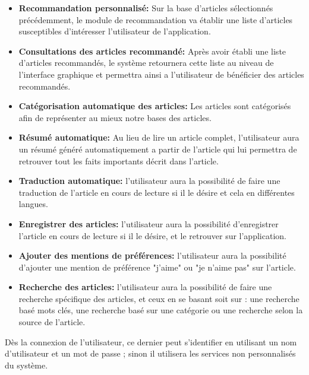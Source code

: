 \begin{itemize}
	
	\item \textbf{Recommandation personnalisé:}
	Sur la base d'articles sélectionnés précédemment, le module de recommandation va établir une liste d'articles susceptibles d'intéresser l'utilisateur de l'application.
	
	\item \textbf{Consultations des articles recommandé:}
	Après avoir établi une liste d'articles recommandés, le système retournera cette liste au niveau de l'interface graphique et permettra ainsi a l'utilisateur de bénéficier des articles recommandés.
		
	\item \textbf{Catégorisation automatique des articles:}
	Les articles sont catégorisés afin de représenter au mieux notre bases des articles.
	
	\item \textbf{Résumé automatique:}
	Au lieu de lire un article complet, l'utilisateur aura un résumé généré automatiquement a partir de l'article qui lui permettra de retrouver tout les faits importants décrit dans l'article.
	
	\item \textbf{Traduction automatique:}
	l'utilisateur aura la possibilité de faire une traduction de l'article en cours de lecture si il le désire et cela en différentes langues.

    \item \textbf{Enregistrer des articles:}
    l'utilisateur aura la possibilité d'enregistrer l'article en cours de lecture si il le désire, et le retrouver sur l'application.
    
    \item \textbf{Ajouter des mentions de préférences:}
    l'utilisateur aura la possibilité d'ajouter une mention de préférence "j'aime" ou "je n'aime pas" sur l'article.

    \item \textbf{Recherche des articles:}
    l'utilisateur aura la possibilité de faire une recherche spécifique des articles, et ceux en se basant soit sur : une recherche basé mots clés, une recherche basé sur une catégorie ou une recherche selon la source de l'article. 
    
\end{itemize}

Dès la connexion de l’utilisateur, ce dernier peut s’identifier en utilisant un nom d’utilisateur et un mot de passe ; sinon il utilisera les services non personnalisés du système.

